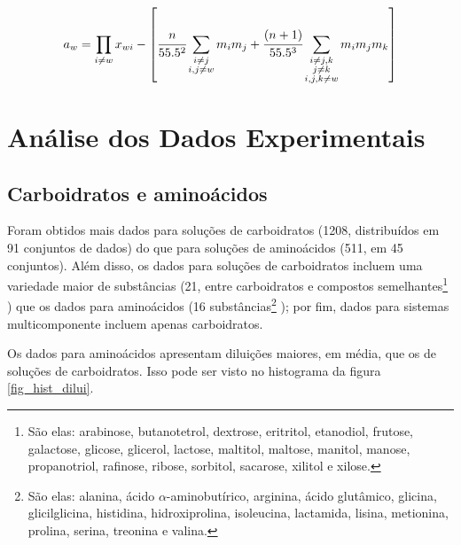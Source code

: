 \documentclass[
	12pt,				%
	openright,
	twoside,
	a4paper,			%
	english,			%
	french,				%
	spanish,			%
	brazil				%
	]{abntex2}
\begin{document}
\begin{equation}
	\label{eq_caurie_raoult}
	a_w = \prod_{i \neq w}x_{wi}-\left[\cfrac{n}%
	{55.5^2}\sum_{\substack{i \neq j \\ i,j \neq w}}%
	m_im_j + \cfrac{(n+1)}{55.5^3}\sum_{%
	\substack{i\neq j,k \\ j \neq k \\  i,j,k \neq w}}%
	m_im_jm_k\right]
\end{equation}

\chapter{Análise dos Dados Experimentais}

\section{Carboidratos e aminoácidos}

Foram obtidos mais dados para soluções de carboidratos (1208, distribuídos em
91 conjuntos de dados) do que para soluções de aminoácidos (511, em 45 conjuntos).
Além disso, os dados para soluções de carboidratos incluem uma variedade maior de
substâncias (21, entre carboidratos e compostos semelhantes\footnote{%
	São elas: arabinose, butanotetrol, dextrose, eritritol, etanodiol,
	frutose, galactose, glicose, glicerol, lactose, maltitol, maltose,
	manitol, manose, propanotriol, rafinose, ribose, sorbitol, sacarose,
	xilitol e xilose.
}
) que os dados para aminoácidos (16 substâncias\footnote{%
	São elas: alanina, ácido $\alpha$-aminobutírico, arginina, ácido
	glutâmico, glicina, glicilglicina, histidina, hidroxiprolina,
	isoleucina, lactamida, lisina, metionina, prolina, serina,
	treonina e valina.
}
); por fim, dados para sistemas multicomponente incluem apenas carboidratos.

Os dados para aminoácidos apresentam diluições maiores, em média, que os de
soluções de carboidratos. Isso pode ser visto no histograma da figura
\ref{fig_hist_dilui}.
\end{document}
